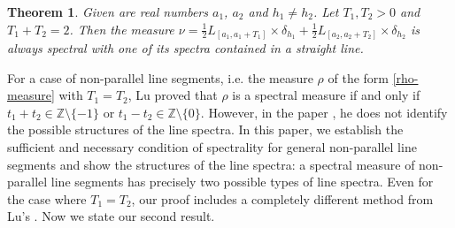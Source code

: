 \documentclass[12pt,a4paper,intlimits,sumlimits]{amsart}
\theoremstyle{plain}
\newtheorem{theorem}{Theorem}
\theoremstyle{definition}
\newcounter{rem}
\begin{document}
\begin{theorem}\label{twoline00} 
Given are real numbers $a_1$, $a_2$  and  $h_1\neq h_2$. Let $T_1, T_2>0$ and $T_1+T_2=2$. Then the measure $\nu=\frac{1}{2}L_{[a_1, a_1+T_1]}\times\delta_{h_1}+\frac{1}{2} L_{[a_2, a_2+T_2]}\times\delta_{h_2}$   is always spectral with one of its spectra contained in a straight line. 
\end{theorem}
 For a case of non-parallel line segments, i.e.  the measure  $\rho$ of the form  \eqref{rho-measure} with 
$T_1=T_2$, Lu \cite{Lu25} proved that $\rho$ is a spectral measure if and only if $t_1+t_2 \in\mathbb{Z} \setminus\{-1\}$ or $t_1-t_2 \in \mathbb{Z} \setminus\{0\}$. However,  in the paper \cite{Lu25},  he  does not identify the possible structures of the line spectra.  In this paper,  we establish  the sufficient and necessary condition of spectrality for general non-parallel line segments and show  the structures of the line spectra:    a spectral measure of non-parallel line segments  has precisely two possible types of line spectra.   Even for the case where $T_1=T_2$, our proof includes a completely different method from Lu's \cite{Lu25}. Now we state our second result. 
\end{document}
